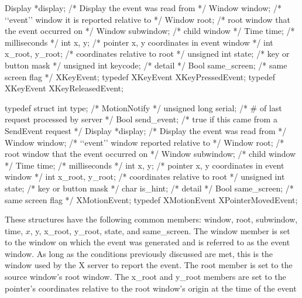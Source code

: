 \documentclass{report}
\begin{document}
\begin{itemize}
\begin{cppcode}
{                    Display *display;       /* Display the event was read from */
                    Window window;          /* ‘‘event’’ window it is reported relative to */
                    Window root;            /* root window that the event occurred on */
                    Window subwindow;       /* child window */
                    Time time;              /* milliseconds */
                    int x, y;               /* pointer x, y coordinates in event window */
                    int x_root, y_root;     /* coordinates relative to root */
                    unsigned int state;     /* key or button mask */
                    unsigned int keycode;   /* detail */
                    Bool same_screen;       /* same screen flag */
                } XKeyEvent;
                typedef XKeyEvent XKeyPressedEvent;
                typedef XKeyEvent XKeyReleasedEvent;
            \end{cppcode}
            \bigbreak \noindent 
            \begin{cppcode}
                typedef struct {
                    int type;               /* MotionNotify */
                    unsigned long serial;   /* # of last request processed by server */
                    Bool send_event;        /* true if this came from a SendEvent request */
                    Display *display;       /* Display the event was read from */
                    Window window;          /* ‘‘event’’ window reported relative to */
                    Window root;            /* root window that the event occurred on */
                    Window subwindow;       /* child window */
                    Time time;              /* milliseconds */
                    int x, y;               /* pointer x, y coordinates in event window */
                    int x_root, y_root;     /* coordinates relative to root */
                    unsigned int state;     /* key or button mask */
                    char is_hint;           /* detail */
                    Bool same_screen;       /* same screen flag */
                } XMotionEvent;
                typedef XMotionEvent XPointerMovedEvent;
            \end{cppcode}
            \bigbreak \noindent 
            These structures have the following common members: window, root, subwindow, time, $x$, y, x\_root, y\_root, state, and same\_screen. The window member is set to the window on which the event was generated and is referred to as the event window. As long as the conditions previously discussed are met, this is the window used by the X server to report the event. The root member is set to the source window’s root window. The x\_root and y\_root members are set to the pointer’s coordinates relative to the root window’s origin at the time of the event

\end{itemize}
\end{document}
